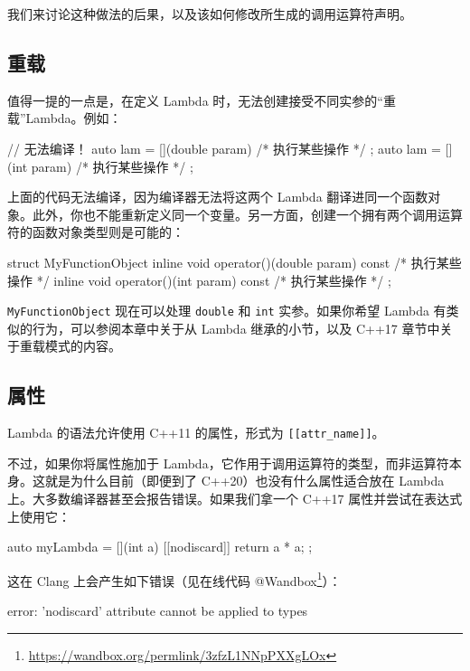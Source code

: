 我们来讨论这种做法的后果，以及该如何修改所生成的调用运算符声明。

\subsection{重载}

值得一提的一点是，在定义 Lambda 时，无法创建接受不同实参的“重载”Lambda。例如：

\begin{codebox}
// 无法编译！
auto lam = [](double param) { /* 执行某些操作 */ };
auto lam = [](int param) { /* 执行某些操作 */ };
\end{codebox}

上面的代码无法编译，因为编译器无法将这两个 Lambda 翻译进同一个函数对象。此外，你也不能重新定义同一个变量。另一方面，创建一个拥有两个调用运算符的函数对象类型则是可能的：

\begin{codebox}
struct MyFunctionObject {
inline void operator()(double param) const { /* 执行某些操作 */ }
inline void operator()(int param) const { /* 执行某些操作 */ }
};
\end{codebox}

\texttt{MyFunctionObject} 现在可以处理 \texttt{double} 和 \texttt{int} 实参。如果你希望 Lambda 有类似的行为，可以参阅本章中关于从 Lambda 继承的小节，以及 C++17 章节中关于重载模式的内容。

\subsection{属性}

Lambda 的语法允许使用 C++11 的属性，形式为 \texttt{[[attr\_name]]}。

不过，如果你将属性施加于 Lambda，它作用于调用运算符的类型，而非运算符本身。这就是为什么目前（即便到了 C++20）也没有什么属性适合放在 Lambda 上。大多数编译器甚至会报告错误。如果我们拿一个 C++17 属性并尝试在表达式上使用它：

\begin{codebox}
auto myLambda = [](int a) [[nodiscard]] { return a * a; };
\end{codebox}

这在 Clang 上会产生如下错误（见在线代码 @Wandbox\footnote{\url{https://wandbox.org/permlink/3zfzL1NNpPXXgLOx}}）：

\begin{codebox}
error: 'nodiscard' attribute cannot be applied to types
\end{codebox}

